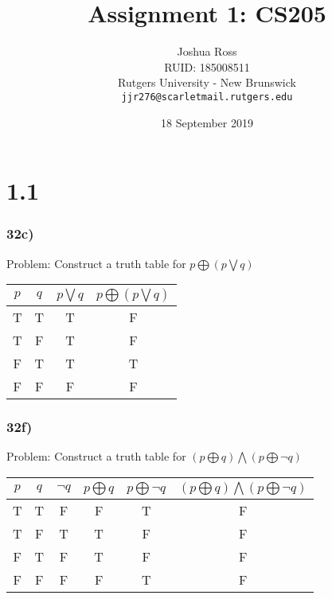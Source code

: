 \documentclass{article}
\begin{document}
\title{Assignment 1: CS205}

\author{Joshua Ross\\
	RUID: 185008511\\
	Rutgers University - New Brunswick\\
	\texttt{jjr276@scarletmail.rutgers.edu}}

\date{18 September 2019}

\maketitle

\section*{1.1}
\subsubsection*{32c)}
Problem: Construct a truth table for $p \bigoplus (p \bigvee q)$
\begin{center}
\begin{tabular}{|c|c|c|c|}
\hline
$p$ & $q$ & $p \bigvee q$ & $p \bigoplus (p \bigvee q)$ \\
\hline
T & T & T & F \\
T & F & T & F \\
F & T & T & T \\
F & F & F & F \\
\hline
\end{tabular}
\end{center}
\subsubsection*{32f)}
Problem: Construct a truth table for $(p \bigoplus q) \bigwedge (p \bigoplus \neg q)$
\begin{center}
\begin{tabular}{|c|c|c|c|c|c|}
\hline
$p$ & $q$ & $\neg q$ & $p \bigoplus q$ & $p \bigoplus \neg q$ & $(p \bigoplus q) \bigwedge (p \bigoplus \neg q)$ \\
\hline
T & T & F & F & T & F\\
T & F & T & T & F & F\\
F & T & F & T & F & F\\
F & F & F & F & T & F\\
\hline
\end{tabular}
\end{center}
\end{document}
